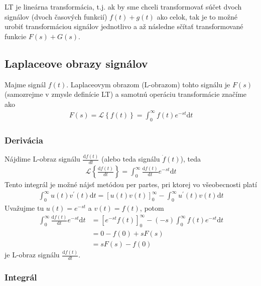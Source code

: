\documentclass[a4paper, 10pt, ]{article}
\begin{document}
LT je lineárna transformácia, t.j. ak by sme chceli transformovať súčet dvoch signálov (dvoch časových funkcií) $f(t) + g(t)$ ako celok, tak je to možné urobiť transformáciou signálov jednotlivo a až následne sčítať transformované funkcie $F(s) + G(s)$.



\subsection{Laplaceove obrazy signálov}

Majme signál $f(t)$. Laplaceovym obrazom (L-obrazom) tohto signálu je $F(s)$ (samozrejme v zmysle definície LT) a samotnú operáciu transformácie značíme ako
\begin{align}
    F(s)  =  \mathcal L \left\{ f(t) \right\} = \int_0^\infty f(t) e^{-st}\text{d}t
\end{align}


\subsubsection{Derivácia}


Nájdime L-obraz signálu $\frac{\text{d}f(t)}{dt}$ (alebo teda signálu $\dot f(t)$), teda
\begin{align}
    \mathcal L \left\{ \frac{\text{d}f(t)}{dt} \right\} = \int_0^\infty \frac{\text{d}f(t)}{\text{d}t} e^{-st}\text{d}t
\end{align}
Tento integrál je možné nájsť metódou per partes, pri ktorej vo všeobecnosti platí
\begin{align}
    \int_0^\infty u(t)v^\prime(t)\text{d}t = \left[ u(t)v(t) \right]_0^\infty - \int_0^\infty u^\prime(t) v(t) \text{d}t
\end{align}
Uvažujme tu $u(t) = e^{-st}$ a $v(t) = f(t)$, potom
\begin{equation}
    \begin{aligned}
        \int_0^\infty \frac{\text{d}f(t)}{\text{d}t} e^{-st}\text{d}t
            &=  \left[ e^{-st} f(t) \right]_0^\infty - (-s)  \int_0^\infty f(t) e^{-st}\text{d}t \\
            &= 0 - f(0) + s F(s) \\
            &= s F(s) - f(0)
    \end{aligned}
\end{equation}
je L-obraz signálu $\frac{\text{d}f(t)}{dt}$.






\subsubsection{Integrál}
\end{document}
